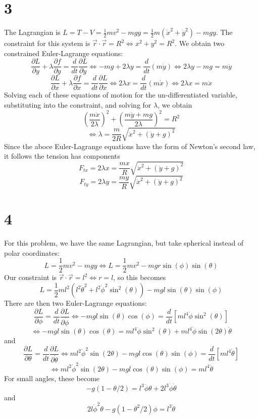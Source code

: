 \documentclass{article}
\begin{document}
\section*{3}
The Lagrangian is $L=T-V=\frac{1}{2}mv^2-mgy=\frac{1}{2}m(\dot{x}^2+\dot{y}^2)-mgy$.
The constraint for this system is $\vec{r}\cdot\vec{r}=R^2\Leftrightarrow x^2+y^2=R^2$.
We obtain two constrained Euler-Lagrange equations:
\[\frac{\partial L}{\partial y}+\lambda\frac{\partial f}{\partial y}=\frac{d}{dt}\frac{\partial L}{\partial \dot{y}}\Leftrightarrow -mg+2\lambda y=\frac{d}{dt}(m\dot{y})\Leftrightarrow2\lambda y-mg=m\ddot{y}\]
\[\frac{\partial L}{\partial x}+\lambda\frac{\partial f}{\partial x}=\frac{d}{dt}\frac{\partial L}{\partial \dot{x}}\Leftrightarrow  2\lambda x=\frac{d}{dt}(m\dot{x}
  )\Leftrightarrow2\lambda x=m\ddot{x}\]
Solving each of these equations of motion for the un-differentiated variable, substituting into the constraint, and solving for $\lambda$, we obtain
\[\left( \frac{m\ddot{x}}{2\lambda} \right)^2+\left( \frac{m\ddot{y}+mg}{2\lambda} \right)^2=R^2\]
\[\Leftrightarrow \lambda=\frac{m}{2R}\sqrt{\ddot{x}^2+(\ddot{y}+g)^2}\]
Since the aboce Euler-Lagrange equations have the form of Newton's second law, it follows the tension has components
\[F_{tx}=2\lambda x=\frac{mx}{R} \sqrt{\ddot{x}^2+(\ddot{y}+g)^2}\]
\[F_{ty}=2\lambda y=\frac{my}{R} \sqrt{\ddot{x}^2+(\ddot{y}+g)^2}\]


\section*{4}
For this problem, we have the same Lagrangian, but take spherical instead of polar coordinates:
\[L=\frac{1}{2}mv^2-mgy \Leftrightarrow L=\frac{1}{2}mv^2-mgr\sin(\phi)\sin(\theta)\]
Our constraint is $\vec{r}\cdot\vec{r}=l^2\Leftrightarrow r=l$, so this becomes
\[L=\frac{1}{2}ml^2(l^2\dot{\theta}^2+l^2\dot{\phi}^2\sin^2(\theta))-mgl\sin(\theta)\sin(\phi)\]
There are then two Euler-Lagrange equations:
\[\frac{\partial L}{\partial \phi}=\frac{d}{dt}\frac{\partial L}{\partial \dot{\phi}}\Leftrightarrow-mgl\sin(\theta)\cos(\phi)=\frac{d}{dt}\left[ ml^4\dot{\phi}\sin^2(\theta) \right]\]
\[\Leftrightarrow -mgl\sin(\theta)\cos(\theta)=ml^4\ddot{\phi}\sin^2(\theta)+ml^4\dot{\phi}\sin(2\theta)\dot{\theta}\]
and
\[\frac{\partial L}{\partial \theta}=\frac{d}{dt}\frac{\partial L}{\partial\dot{\theta}}\Leftrightarrow ml^2\dot{\phi}^2\sin(2\theta)-mgl\cos(\theta)\sin(\phi)=\frac{d}{dt}\left[ ml^4\dot{\theta} \right]\]
\[\Leftrightarrow ml^2\dot{\phi}^2\sin(2\theta)-mgl\cos(\theta)\sin(\phi)=ml^4\ddot{\theta}\]
For small angles, these become
\[-g(1-\theta/2)=l^3\ddot{\phi}\theta+2l^3\dot{\phi}\dot{\theta}\]
and
\[2l\dot{\phi}^2\theta-g(1-\theta^2/2)\phi=l^3\ddot{\theta}\]
\end{document}

